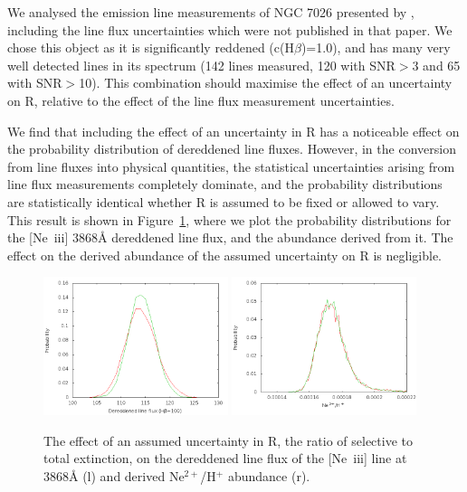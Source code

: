 \documentclass[useAMS,usenatbib]{mn2e}
\begin{document}
We analysed the emission line measurements of NGC 7026 presented by \citet{2005MNRAS.362..424W}, including the line flux uncertainties which were not published in that paper.  We chose this object as it is significantly reddened (c(H$\beta$)=1.0), and has many very well detected lines in its spectrum (142 lines measured, 120 with SNR$>$3 and 65 with SNR$>$10).  This combination should maximise the effect of an uncertainty on R, relative to the effect of the line flux measurement uncertainties.

We find that including the effect of an uncertainty in R has a noticeable effect on the probability distribution of dereddened line fluxes.  However, in the conversion from line fluxes into physical quantities, the statistical uncertainties arising from line flux measurements completely dominate, and the probability distributions are statistically identical whether R is assumed to be fixed or allowed to vary.  This result is shown in Figure~\ref{R_effect}, where we plot the probability distributions for the [Ne~{\sc iii}] 3868{\AA} dereddened line flux, and the abundance derived from it.  The effect on the derived abundance of the assumed uncertainty on R is negligible.

\begin{figure}
\includegraphics[width=0.48\textwidth]{figures/Reffect_flux.png}
\includegraphics[width=0.48\textwidth]{figures/Reffect_abundance.png}
\caption{The effect of an assumed uncertainty in R, the ratio of selective to total extinction, on the dereddened line flux of the [Ne~{\sc iii}] line at 3868{\AA} (l) and derived Ne$^{2+}$/H$^+$ abundance (r).} 
\label{R_effect}
\end{figure}
\end{document}

